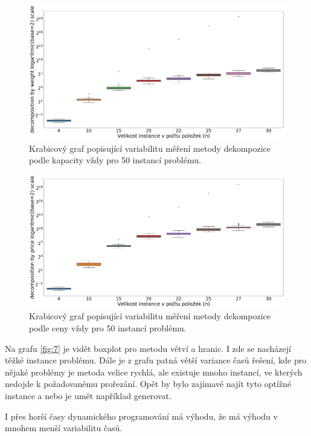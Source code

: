 \documentclass[11pt]{article}
\begin{document}
\begin{figure}[h]\centering
	\includegraphics[scale=0.2]{img/boxDW}
 	\caption[2]{Krabicový graf popisující variabilitu měření metody dekompozice podle kapacity vždy pro 50 instancí problému.}\label{fig:5}
 \end{figure} 	
 \begin{figure}[h]\centering
	\includegraphics[scale=0.2]{img/boxDC}
 	\caption[2]{Krabicový graf popisující variabilitu měření metody dekompozice podle ceny vždy pro 50 instancí problému.}\label{fig:6}
 \end{figure}

Na grafu \ref{fig:7} je vidět boxplot pro metodu větví a hranic. I zde se nacházejí těžké instance problému. Dále je z grafu patná větší variance časů řešení, kde pro nějaké problémy je metoda velice rychlá, ale existuje mnoho instancí, ve kterých nedojde k požadovanému prořezání. Opět by bylo zajímavé najít tyto optížné instance a nebo je umět například generovat.

I přes horší časy dynamického programování má výhodu, že má výhodu v mnohem menší variabilitu časů.
\end{document}
